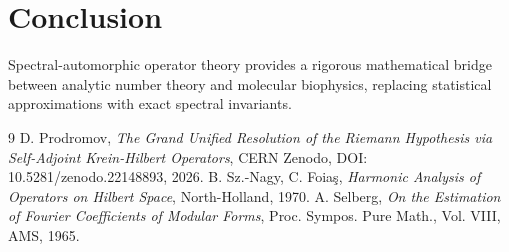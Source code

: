 \documentclass[11pt,a4paper]{article}
\theoremstyle{definition}
\begin{document}
\section{Conclusion}
Spectral-automorphic operator theory provides a rigorous mathematical bridge between analytic number theory and molecular biophysics, replacing statistical approximations with exact spectral invariants.

\begin{thebibliography}{9}
 D. Prodromov, \emph{The Grand Unified Resolution of the Riemann Hypothesis via Self-Adjoint Krein-Hilbert Operators}, CERN Zenodo, DOI: 10.5281/zenodo.22148893, 2026.
 B. Sz.-Nagy, C. Foia\c{s}, \emph{Harmonic Analysis of Operators on Hilbert Space}, North-Holland, 1970.
 A. Selberg, \emph{On the Estimation of Fourier Coefficients of Modular Forms}, Proc. Sympos. Pure Math., Vol. VIII, AMS, 1965.
\end{thebibliography}
\end{document}
